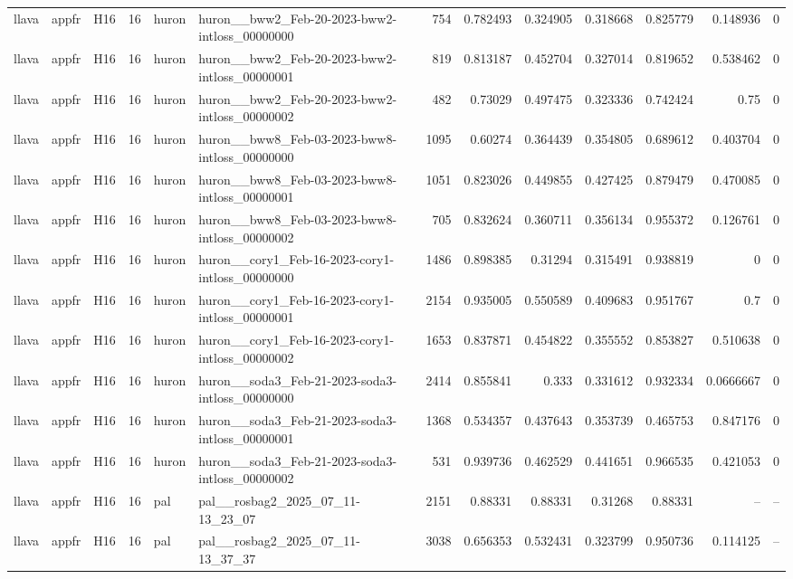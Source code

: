 \begin{longtable}{lllrllrrrrrrr}
llava & appfr & H16 & 16 & huron & huron\_\_bww2\_Feb-20-2023-bww2-intloss\_00000000 & 754 & 0.782493 & 0.324905 & 0.318668 & 0.825779 & 0.148936 & 0 \\
llava & appfr & H16 & 16 & huron & huron\_\_bww2\_Feb-20-2023-bww2-intloss\_00000001 & 819 & 0.813187 & 0.452704 & 0.327014 & 0.819652 & 0.538462 & 0 \\
llava & appfr & H16 & 16 & huron & huron\_\_bww2\_Feb-20-2023-bww2-intloss\_00000002 & 482 & 0.73029 & 0.497475 & 0.323336 & 0.742424 & 0.75 & 0 \\
llava & appfr & H16 & 16 & huron & huron\_\_bww8\_Feb-03-2023-bww8-intloss\_00000000 & 1095 & 0.60274 & 0.364439 & 0.354805 & 0.689612 & 0.403704 & 0 \\
llava & appfr & H16 & 16 & huron & huron\_\_bww8\_Feb-03-2023-bww8-intloss\_00000001 & 1051 & 0.823026 & 0.449855 & 0.427425 & 0.879479 & 0.470085 & 0 \\
llava & appfr & H16 & 16 & huron & huron\_\_bww8\_Feb-03-2023-bww8-intloss\_00000002 & 705 & 0.832624 & 0.360711 & 0.356134 & 0.955372 & 0.126761 & 0 \\
llava & appfr & H16 & 16 & huron & huron\_\_cory1\_Feb-16-2023-cory1-intloss\_00000000 & 1486 & 0.898385 & 0.31294 & 0.315491 & 0.938819 & 0 & 0 \\
llava & appfr & H16 & 16 & huron & huron\_\_cory1\_Feb-16-2023-cory1-intloss\_00000001 & 2154 & 0.935005 & 0.550589 & 0.409683 & 0.951767 & 0.7 & 0 \\
llava & appfr & H16 & 16 & huron & huron\_\_cory1\_Feb-16-2023-cory1-intloss\_00000002 & 1653 & 0.837871 & 0.454822 & 0.355552 & 0.853827 & 0.510638 & 0 \\
llava & appfr & H16 & 16 & huron & huron\_\_soda3\_Feb-21-2023-soda3-intloss\_00000000 & 2414 & 0.855841 & 0.333 & 0.331612 & 0.932334 & 0.0666667 & 0 \\
llava & appfr & H16 & 16 & huron & huron\_\_soda3\_Feb-21-2023-soda3-intloss\_00000001 & 1368 & 0.534357 & 0.437643 & 0.353739 & 0.465753 & 0.847176 & 0 \\
llava & appfr & H16 & 16 & huron & huron\_\_soda3\_Feb-21-2023-soda3-intloss\_00000002 & 531 & 0.939736 & 0.462529 & 0.441651 & 0.966535 & 0.421053 & 0 \\
llava & appfr & H16 & 16 & pal & pal\_\_rosbag2\_2025\_07\_11-13\_23\_07 & 2151 & 0.88331 & 0.88331 & 0.31268 & 0.88331 & -- & -- \\
llava & appfr & H16 & 16 & pal & pal\_\_rosbag2\_2025\_07\_11-13\_37\_37 & 3038 & 0.656353 & 0.532431 & 0.323799 & 0.950736 & 0.114125 & -- \\

\end{longtable}

